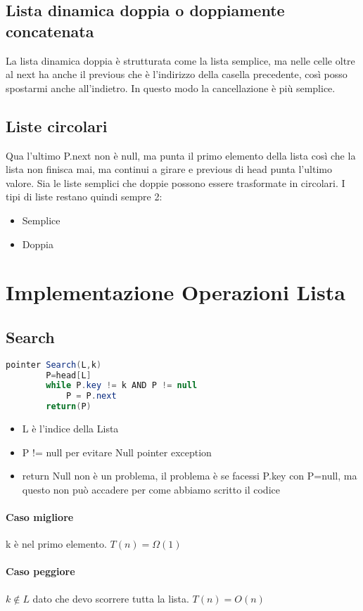 \subsection{Lista dinamica doppia o doppiamente concatenata}
La lista dinamica doppia è strutturata come la lista semplice, ma nelle celle oltre 
al next ha anche il previous che è l'indirizzo della casella precedente, così posso
spostarmi anche all'indietro. In questo modo la cancellazione è più semplice.
\subsection{Liste circolari}
Qua l'ultimo P.next non è null, ma punta il primo elemento della lista così che la lista non
finisca mai, ma continui a girare e previous di head punta l'ultimo valore. Sia le liste
semplici che doppie possono essere trasformate in circolari. I tipi di liste
restano quindi sempre 2:
\begin{itemize}
    \item Semplice
    \item Doppia
\end{itemize}
\section{Implementazione Operazioni Lista}
\subsection{Search}
\begin{lstlisting}[language=Java]
    pointer Search(L,k)
        P=head[L]
        while P.key != k AND P != null
            P = P.next
        return(P)
\end{lstlisting}
\begin{itemize}
    \item L è l'indice della Lista
    \item P != null per evitare Null pointer exception
    \item return Null non è un problema, il problema è se facessi P.key con P=null, ma questo
    non può accadere per come abbiamo scritto il codice
\end{itemize}
\paragraph*{Caso migliore} k è nel primo elemento. $T(n)=\Omega(1)$
\paragraph*{Caso peggiore} $k \notin  L$ dato che devo scorrere tutta la lista.
$T(n) = O(n)$\\
